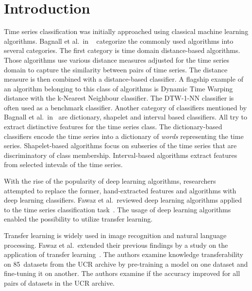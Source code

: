 \documentclass[a4paper,11pt,twoside]{report}
\theoremstyle{definition}
\begin{document}
\chapter{Introduction}
Time series classification was initially approached using classical machine learning algorithms. Bagnall et al.~in ~\cite{bake_off} categorize the commonly used algorithms into several categories. The first category is time domain distance-based algorithms. Those algorithms use various distance measures adjusted for the time series domain to capture the similarity between pairs of time series. The distance measure is then combined with a distance-based classifier. A flagship example of an algorithm belonging to this class of algorithms is Dynamic Time Warping distance with the k-Nearest Neighbour classifier. The DTW-1-NN classifier is often used as a benchmark classifier. Another category of classifiers mentioned by Bagnall et al.~in~\cite{bake_off} are dictionary, shapelet and interval based classifiers. All try to extract distinctive features for the time series class. The dictionary-based classifiers encode the time series into a dictionary of \textit{words} representing the time series. Shapelet-based algorithms focus on subseries of the time series that are discriminatory of class membership. Interval-based algorithms extract features from selected intevals of the time series.

With the rise of the popularity of deep learning algorithms, researchers attempted to replace the former, hand-extracted features and algorithms with deep learning classifiers. Fawaz et al.~reviewed deep learning algorithms applied to the time series classification task~\cite{dl_tsc}. The usage of deep learning algorithms enabled the possibility to utilize transfer learning.

Transfer learning is widely used in image recognition and natural language processing. Fawaz et al.~extended their previous findings by a study on the application of transfer learning~\cite{dl_tsc}. The authors examine knowledge transferability on 85~datasets from the UCR archive by pre-training a model on one dataset and fine-tuning it on another. The authors examine if the accuracy improved for all pairs of datasets in the UCR archive.
\end{document}
